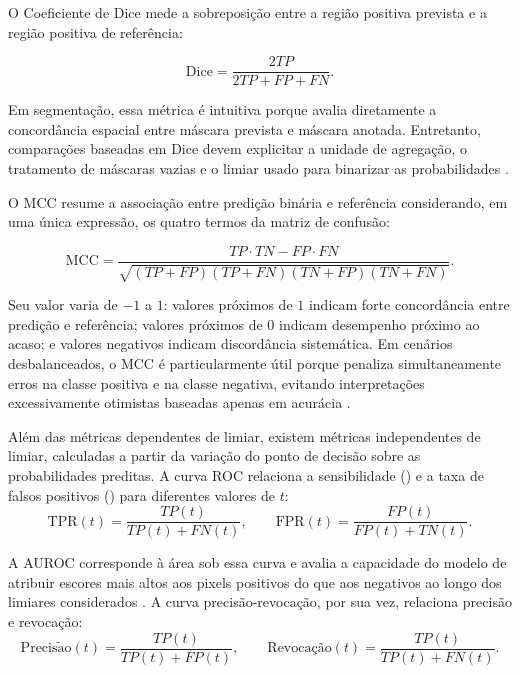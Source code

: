 O Coeficiente de Dice mede a sobreposição entre a região positiva prevista e a região positiva de referência: 

\begin{equation}\label{eq:dice-revisao} \mathrm{Dice} = \frac{2TP}{2TP+FP+FN}. \end{equation} 

Em segmentação, essa métrica é intuitiva porque avalia diretamente a concordância espacial entre máscara prevista e máscara anotada. Entretanto, comparações baseadas em Dice devem explicitar a unidade de agregação, o tratamento de máscaras vazias e o limiar usado para binarizar as probabilidades \cite{seghier2024dice}.

O MCC resume a associação entre predição binária e referência considerando, em uma única expressão, os quatro termos da matriz de confusão:

\begin{equation}\label{eq:mcc} \mathrm{MCC} = \frac{TP \cdot TN - FP \cdot FN} {\sqrt{(TP+FP)(TP+FN)(TN+FP)(TN+FN)}}. \end{equation} 

Seu valor varia de $-1$ a $1$: valores próximos de $1$ indicam forte concordância entre predição e referência; valores próximos de $0$ indicam desempenho próximo ao acaso; e valores negativos indicam discordância sistemática. Em cenários desbalanceados, o MCC é particularmente útil porque penaliza simultaneamente erros na classe positiva e na classe negativa, evitando interpretações excessivamente otimistas baseadas apenas em acurácia \cite{chicco2020advantages}.

Além das métricas dependentes de limiar, existem métricas independentes de limiar, calculadas a partir da variação do ponto de decisão sobre as probabilidades preditas. A curva ROC relaciona a sensibilidade () e a taxa de falsos positivos () para diferentes valores de $t$: \begin{equation}\label{eq:tpr-fpr} \mathrm{TPR}(t)=\frac{TP(t)}{TP(t)+FN(t)}, \qquad \mathrm{FPR}(t)=\frac{FP(t)}{FP(t)+TN(t)}. \end{equation} 

A AUROC corresponde à área sob essa curva e avalia a capacidade do modelo de atribuir escores mais altos aos pixels positivos do que aos negativos ao longo dos limiares considerados \cite{fawcett2006roc}. A curva precisão-revocação, por sua vez, relaciona precisão e revocação: 
\begin{equation}\label{eq:precision-recall} \mathrm{Precis\tilde{a}o}(t)=\frac{TP(t)}{TP(t)+FP(t)}, \qquad \text{Revoca\c{c}\~ao}(t)=\frac{TP(t)}{TP(t)+FN(t)}. \end{equation} 

